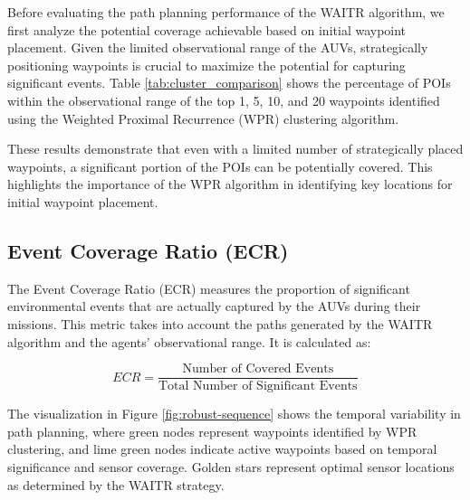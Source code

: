 \documentclass[conference]{IEEEtran}
\begin{document}
Before evaluating the path planning performance of the WAITR algorithm, we first analyze the potential coverage achievable based on initial waypoint placement. Given the limited observational range of the AUVs, strategically positioning waypoints is crucial to maximize the potential for capturing significant events.  Table \ref{tab:cluster_comparison} shows the percentage of POIs within the observational range of the top 1, 5, 10, and 20 waypoints identified using the Weighted Proximal Recurrence (WPR) clustering algorithm.

\begin{table}[h]
\centering
{}
\caption{Coverage comparisons using WPR clustering}
\label{tab:cluster_comparison}
\end{table}

These results demonstrate that even with a limited number of strategically placed waypoints, a significant portion of the POIs can be potentially covered. This highlights the importance of the WPR algorithm in identifying key locations for initial waypoint placement. 

\subsection{Event Coverage Ratio (ECR)}

The Event Coverage Ratio (ECR) measures the proportion of significant environmental events that are actually captured by the AUVs during their missions. This metric takes into account the paths generated by the WAITR algorithm and the agents' observational range. It is calculated as:

\[
ECR = \frac{\text{Number of Covered Events}}{\text{Total Number of Significant Events}}
\]

The visualization in Figure \ref{fig:robust-sequence} shows the temporal variability in path planning, where green nodes represent waypoints identified by WPR clustering, and lime green nodes indicate active waypoints based on temporal significance and sensor coverage. Golden stars represent optimal sensor locations as determined by the WAITR strategy.
\end{document}
